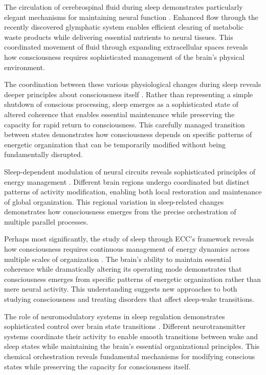 The circulation of cerebrospinal fluid during sleep demonstrates particularly elegant mechanisms for maintaining neural function \cite{Xie2013}. Enhanced flow through the recently discovered glymphatic system enables efficient clearing of metabolic waste products while delivering essential nutrients to neural tissues. This coordinated movement of fluid through expanding extracellular spaces reveals how consciousness requires sophisticated management of the brain's physical environment.

The coordination between these various physiological changes during sleep reveals deeper principles about consciousness itself \cite{Saper2017}. Rather than representing a simple shutdown of conscious processing, sleep emerges as a sophisticated state of altered coherence that enables essential maintenance while preserving the capacity for rapid return to consciousness. This carefully managed transition between states demonstrates how consciousness depends on specific patterns of energetic organization that can be temporarily modified without being fundamentally disrupted.

Sleep-dependent modulation of neural circuits reveals sophisticated principles of energy management \cite{Vyazovskiy2013}. Different brain regions undergo coordinated but distinct patterns of activity modification, enabling both local restoration and maintenance of global organization. This regional variation in sleep-related changes demonstrates how consciousness emerges from the precise orchestration of multiple parallel processes.

Perhaps most significantly, the study of sleep through ECC's framework reveals how consciousness requires continuous management of energy dynamics across multiple scales of organization \cite{Scammell2017}. The brain's ability to maintain essential coherence while dramatically altering its operating mode demonstrates that consciousness emerges from specific patterns of energetic organization rather than mere neural activity. This understanding suggests new approaches to both studying consciousness and treating disorders that affect sleep-wake transitions.

The role of neuromodulatory systems in sleep regulation demonstrates sophisticated control over brain state transitions \cite{Zhang2018}. Different neurotransmitter systems coordinate their activity to enable smooth transitions between wake and sleep states while maintaining the brain's essential organizational principles. This chemical orchestration reveals fundamental mechanisms for modifying conscious states while preserving the capacity for consciousness itself.


